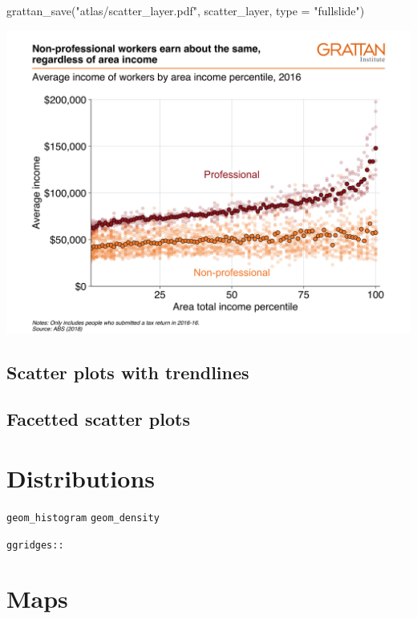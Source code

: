 \documentclass[
]{book}
\newenvironment{Shaded}{\begin{snugshade}}{\end{snugshade}}
\newcommand{\AttributeTok}[1]{\textcolor[rgb]{0.77,0.63,0.00}{#1}}
\newcommand{\FunctionTok}[1]{\textcolor[rgb]{0.00,0.00,0.00}{#1}}
\newcommand{\NormalTok}[1]{#1}
\newcommand{\StringTok}[1]{\textcolor[rgb]{0.31,0.60,0.02}{#1}}
\begin{document}
\begin{Shaded}
\begin{Highlighting}[]
\FunctionTok{grattan\_save}\NormalTok{(}\StringTok{"atlas/scatter\_layer.pdf"}\NormalTok{, scatter\_layer, }\AttributeTok{type =} \StringTok{"fullslide"}\NormalTok{)}
\end{Highlighting}
\end{Shaded}

\includegraphics{atlas/scatter_layer.png}

\hypertarget{scatter-plots-with-trendlines}{%
\subsection{Scatter plots with trendlines}\label{scatter-plots-with-trendlines}}

\hypertarget{facetted-scatter-plots}{%
\subsection{Facetted scatter plots}\label{facetted-scatter-plots}}

\hypertarget{distributions}{%
\section{Distributions}\label{distributions}}

\texttt{geom\_histogram}
\texttt{geom\_density}

\texttt{ggridges::}

\hypertarget{maps}{%
\section{Maps}\label{maps}}
\end{document}
